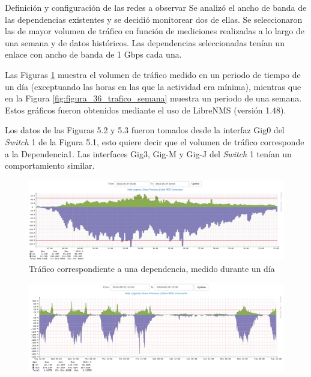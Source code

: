     \begin{subsection}{Definición y configuración de las redes a observar}
    Se analizó el ancho de banda de las dependencias existentes y se decidió monitorear dos de ellas. Se seleccionaron las de mayor volumen de tráfico en función de mediciones realizadas a lo largo de una semana y de datos históricos. Las dependencias seleccionadas tenían un enlace con ancho de banda de 1 Gbps cada una. \par
    Las Figuras \ref{fig:figura_35_trafico_dia} muestra el volumen de tráfico medido en un periodo de tiempo de un día (exceptuando las horas en las que la actividad era mínima), mientras que en la Figura \ref{fig:figura_36_trafico_semana} muestra un periodo de una semana. Estos gráficos fueron obtenidos mediante el uso de LibreNMS \cite{librenms} (versión 1.48).\par
    Los datos de las Figuras 5.2 y 5.3 fueron tomados desde la interfaz Gig0 del \textit{Switch} 1 de la Figura 5.1, esto quiere decir que el volumen de tráfico corresponde a la Dependencia1. Las interfaces Gig3, Gig-M y Gig-J del \textit{Switch} 1 tenían un comportamiento similar.\par
    \begin{figure}[H]
    \centering
    \includegraphics[width=1\textwidth]{./iteracion_1_imagenes/figura_35_trafico_dia.png}
    \caption{Tráfico correspondiente a una dependencia, medido durante un día }
    \label{fig:figura_35_trafico_dia}
    \end{figure}
    \begin{figure}[H]
    \centering
    \includegraphics[width=1\textwidth]{./iteracion_1_imagenes/figura_36_trafico_semana_editada.png}

\end{figure}
\end{subsection}
